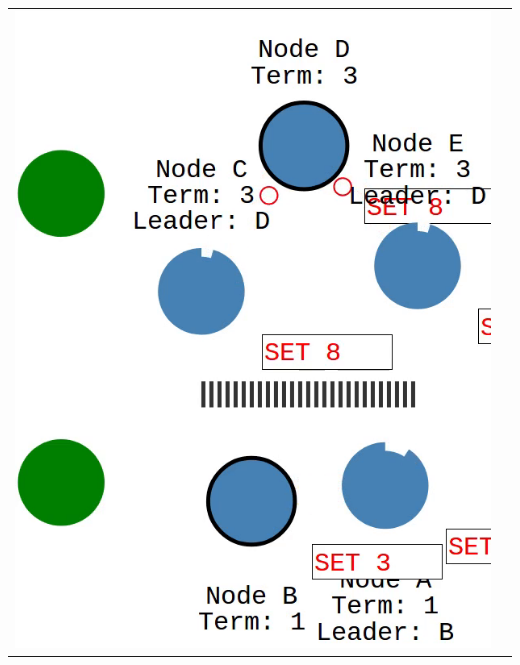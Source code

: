\begin{tabularx}{\textwidth}{ |X|X| }
  \hline
  \includegraphics[scale=0.28]{scenarios/network_partition/1830.png} &

\end{tabularx}
